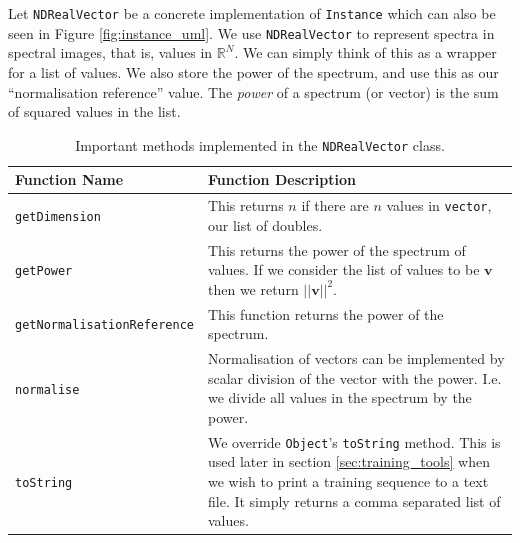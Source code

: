 \documentclass[12pt,twoside,notitlepage]{report}
\newcommand{\vc}[1]{\mathbf{#1}}
\newcommand{\bb}[1]{\mathbb{#1}}
\begin{document}
                Let \texttt{NDRealVector} be a concrete implementation of \texttt{Instance} which can also 
                be seen in Figure \ref{fig:instance_uml}. We use \texttt{NDRealVector} to represent spectra in spectral 
                images, that is, values in $\bb{R}^N$. We can simply think of this as 
                a wrapper for a list of values. We also store the power of the spectrum, and use this as our 
                ``normalisation reference'' value. The \textit{power} of a spectrum (or vector) is the sum 
                of squared values in the list.

                \begin{table}[H]
                    \begin{tabularx}{\textwidth}{l|X}
                        \textbf{Function Name} & \textbf{Function Description} \\
                        \hline

                        \texttt{getDimension} & 
                            This returns $n$ if there are $n$ values in \texttt{vector}, our list of doubles.  \\ 
                        \hline

                        \texttt{getPower} & 
                            This returns the power of the spectrum of values. If we consider the list of values 
                            to be $\vc{v}$ then we return $||\vc{v}||^2$. \\ 
                        \hline

                        \texttt{getNormalisationReference} & 
                            This function returns the power of the spectrum. \\
                        \hline

                        \texttt{normalise} & 
                            Normalisation of vectors can be implemented by scalar division of the vector with the power. 
                            I.e. we divide all values in the spectrum by the power. \\ 
                        \hline

                        \texttt{toString} & 
                            We override \texttt{Object}'s \texttt{toString} method. This is used later in section 
                            \ref{sec:training_tools} when we wish to print a training sequence to a text file. It 
                            simply returns a comma separated list of values. 

                    \end{tabularx}
                    \caption{Important methods implemented in the \texttt{NDRealVector} class.}
                    \label{tab:NDRealVector}
                \end{table}
\end{document}
